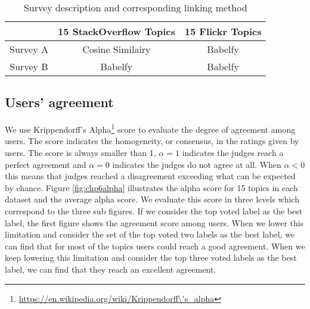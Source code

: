 

\begin{table}[htp]
\caption{Survey description and corresponding linking method}
\label{tab:chp6survey}
\centering
\begin{tabular}{|c|c|c|}
\hline
             &  15 StackOverflow Topics & 15 Flickr Topics \\ \hline
    Survey A & Cosine Similairy & Babelfy\\ \hline  
    Survey B &  Babelfy          & Babelfy\\ \hline
\end{tabular}

\end{table}


\subsection{Users' agreement}
We use Krippendorff's Alpha\footnote{\url{https://en.wikipedia.org/wiki/Krippendorff\'s_alpha}} score to evaluate the degree of agreement among users. The score indicates the homogeneity, or consensus, in the ratings given by users. The score is always smaller than 1, $\alpha = 1 $ indicates the judges reach a perfect agreement and $\alpha =0 $ indicates the judges do not agree at all. When $\alpha <0 $ this means that judges reached a disagreement exceeding what can be expected by chance.  
Figure \ref{fig:chp6alpha} illustrates the alpha score for 15 topics in each dataset and the average alpha score. We evaluate this score in three levels which correspond to the three sub figures. If we consider the top voted label as the best label, the first figure shows the agreement score among users. When we lower this limitation and consider the set of the top voted two labels as the best label, we can find that for most of the topics users could reach a good agreement. When we keep lowering this limitation and consider the top three voted labels as the best label, we can find that they reach an excellent agreement. 



